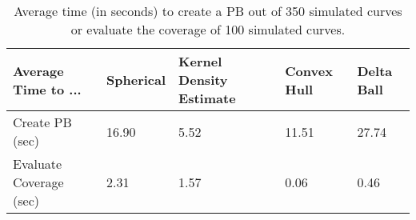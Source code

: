 \begin{table}[h!]
\centering
\caption{Average time (in seconds) to create a PB out of 350 simulated curves or evaluate the coverage of 100 simulated curves.} 
\label{tab:comp_time_summary}
\begin{tabular}{R{2in}L{.75in}L{1.1in}L{.9in}L{.75in}}
  \hline
\hline
Average Time to ... & Spherical & Kernel Density Estimate & Convex Hull & Delta Ball \\ 
  \hline
Create PB (sec) & 16.90 &  5.52 & 11.51 & 27.74 \\ 
  Evaluate Coverage (sec) & 2.31 & 1.57 & 0.06 & 0.46 \\ 
   \hline
\end{tabular}
\end{table}
